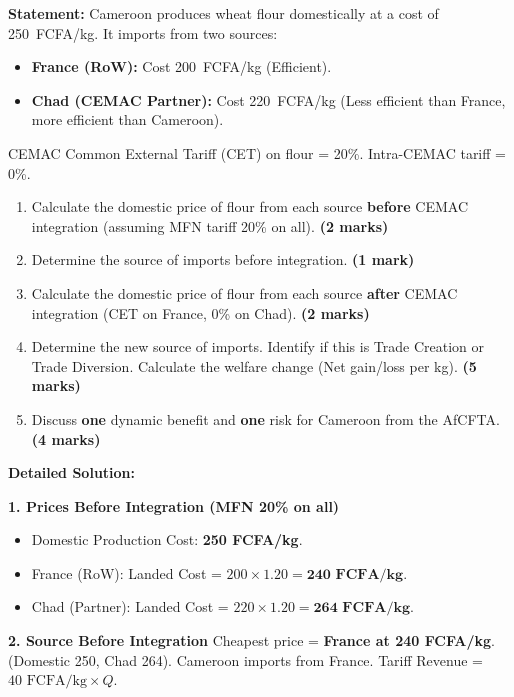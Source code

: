 \documentclass[11pt]{article}
\begin{document}
\begin{exoresolu}
\textbf{Statement:} Cameroon produces wheat flour domestically at a cost of \SI{250}{FCFA/kg}. It imports from two sources:
\begin{itemize}
    \item \textbf{France (RoW):} Cost \SI{200}{FCFA/kg} (Efficient).
    \item \textbf{Chad (CEMAC Partner):} Cost \SI{220}{FCFA/kg} (Less efficient than France, more efficient than Cameroon).
\end{itemize}
CEMAC Common External Tariff (CET) on flour = 20\%. Intra-CEMAC tariff = 0\%.
\begin{enumerate}
    \item Calculate the domestic price of flour from each source \textbf{before} CEMAC integration (assuming MFN tariff 20\% on all). \textbf{(2 marks)}
    \item Determine the source of imports before integration. \textbf{(1 mark)}
    \item Calculate the domestic price of flour from each source \textbf{after} CEMAC integration (CET on France, 0\% on Chad). \textbf{(2 marks)}
    \item Determine the new source of imports. Identify if this is Trade Creation or Trade Diversion. Calculate the welfare change (Net gain/loss per kg). \textbf{(5 marks)}
    \item Discuss \textbf{one} dynamic benefit and \textbf{one} risk for Cameroon from the AfCFTA. \textbf{(4 marks)}
\end{enumerate}

\tcblower
\textbf{Detailed Solution:}

\textbf{1. Prices Before Integration (MFN 20\% on all)}
\begin{itemize}
    \item Domestic Production Cost: \textbf{250 FCFA/kg}.
    \item France (RoW): Landed Cost = $200 \times 1.20 = \mathbf{240 \text{ FCFA/kg}}$.
    \item Chad (Partner): Landed Cost = $220 \times 1.20 = \mathbf{264 \text{ FCFA/kg}}$.
\end{itemize}

\textbf{2. Source Before Integration}
Cheapest price = \textbf{France at 240 FCFA/kg}. (Domestic 250, Chad 264).
Cameroon imports from France. Tariff Revenue = $40 \text{ FCFA/kg} \times Q$.


\end{exoresolu}
\end{document}
